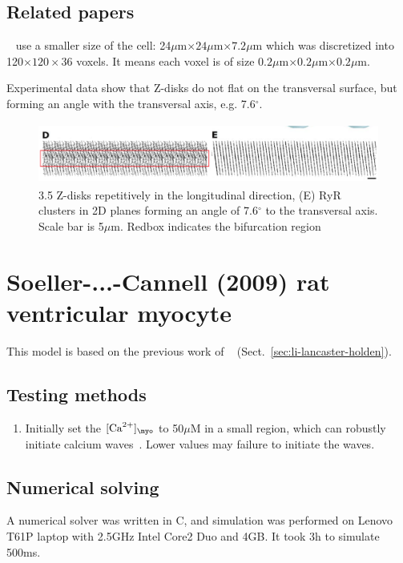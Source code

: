 \subsection{Related papers}
\label{sec:related-papers}

~\citep{li2009} use a smaller size of the cell: 24$\mu$m$\times
24\mu$m$\times 7.2\mu$m which was discretized into 120$\times
120\times 36$ voxels. It means each voxel is of size $0.2\mu$m$\times
0.2\mu$m$\times 0.2\mu$m.

Experimental data show that Z-disks do not flat on the transversal
surface, but forming an angle with the transversal axis,
e.g. 7.6$^\circ$. 
\begin{figure}[hbt]
  \centerline{\includegraphics[height=2cm,
    angle=0]{./images/Li_Zdisk.eps}}
  \caption{3.5 Z-disks repetitively in the longitudinal direction, (E)
    RyR clusters in 2D planes forming an angle of 7.6$^\circ$ to the
    transversal axis. Scale bar is 5$\mu$m. Redbox indicates the
    bifurcation region}
\label{fig:Li_Zdisk}
\end{figure}



\section{Soeller-...-Cannell (2009) rat ventricular myocyte}
\label{sec:soeller-...-cannell}

This model is based on the previous work of ~\citep{li2007}
(Sect.~\ref{sec:li-lancaster-holden}). 

\subsection{Testing methods}
\label{sec:testing-methods}

\begin{enumerate}
\item Initially set the $[\Ca]_\myo$ to 50$\mu$M in a small region,
  which can robustly initiate calcium waves~\citep{soeller2008}. Lower
  values may failure to initiate the waves.
\end{enumerate}

\subsection{Numerical solving}
\label{sec:numerical-solving-3}

A numerical solver was written in C, and simulation was performed on
Lenovo T61P laptop with 2.5GHz Intel Core2 Duo and 4GB. It took 3h to
simulate 500ms. 

